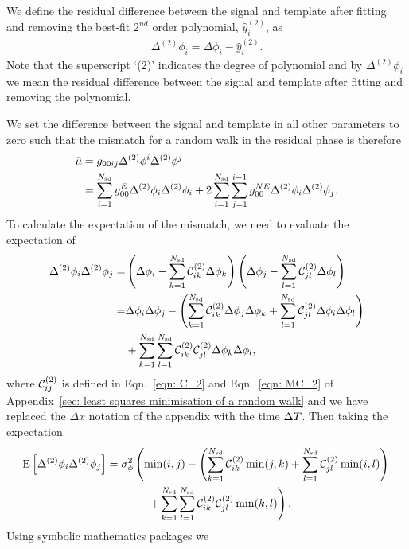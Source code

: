 \documentclass[../full_thesis/full_thesis.tex]{subfiles}
\begin{document}
We define the residual difference between the signal and template
after fitting and removing the best-fit $2^{nd}$ order polynomial, $\hat{y}_i^{(2)}$, as
\begin{align}
\Delta^{(2)}\phi_i = \Delta\phi_i - \hat{y}_i^{(2)}.
\label{eqn: D2phi}
\end{align}
Note that the superscript `(2)' indicates the degree of polynomial and by
$\Delta^{(2)}\phi_i$ we mean the residual difference between the signal and
template after fitting and removing the polynomial.

We set the difference between the signal and template in all other parameters
to zero such that the mismatch for a random walk in the residual phase is
therefore
\begin{align}
\tilde{\mu} & = g_{0 0 i j} \Delta^{(2)}\phi^{i}\Delta^{(2)}\phi^{j} \\
& = \sum_{i=1}^{N_{\textrm{sd}}}g_{00}^{E} \Delta^{(2)}\phi_{i}\Delta^{(2)}\phi_{i}
+ 2 \sum_{i=1}^{N_{\textrm{sd}}}\sum_{j=1}^{i-1}g_{00}^{NE}\Delta^{(2)}\phi_{i}\Delta^{(2)}\phi_{j}.
\label{eqn: 4202540871}
\end{align}
To calculate the expectation of the mismatch, we need to evaluate the
expectation of
\begin{align}
\Delta^{(2)}\phi_{i}\Delta^{(2)}\phi_{j} = & \left(\Delta\phi_{i}
- \sum_{k=1}^{N_{\textrm{sd}}}\mathcal{C}^{(2)}_{ik}\Delta\phi_{k}\right)
 \left(\Delta\phi_{j} - \sum_{l=1}^{N_{\textrm{sd}}}\mathcal{C}^{(2)}_{jl}\Delta\phi_{l}\right) \\
= & \Delta\phi_{i}\Delta\phi_{j} -
\left(\sum_{k=1}^{N_{\textrm{sd}}}\mathcal{C}^{(2)}_{ik} \Delta\phi_{j}\Delta\phi_{k}
+ \sum_{l=1}^{N_{\textrm{sd}}}\mathcal{C}^{(2)}_{jl}\Delta\phi_{i}\Delta\phi_{l}\right) \nonumber \\
& +
\sum_{k=1}^{N_{\textrm{sd}}}\sum_{l=1}^{N_{\textrm{sd}}}\mathcal{C}^{(2)}_{ik}\mathcal{C}^{(2)}_{jl} \Delta\phi_{k}\Delta\phi_{l},
\end{align}
where $\mathcal{C}^{(2)}_{ij}$ is defined in Eqn.~\eqref{eqn: C_2} and Eqn.~\eqref{eqn: MC_2} of
Appendix~\ref{sec: least squares minimisation of a random walk} and we have
replaced the $\Delta x$ notation of the appendix with the time $\Delta T$. Then
taking the expectation
\begin{align}
\E{\Delta^{(2)}\phi_{i}\Delta^{(2)}\phi_{j}} & =
\sigma^{2}_{\phi} \left(\min(i, j) - \left(\s{k=1}{\Nsd}\CT_{ik} \min(j, k)
+ \s{l=1}{\Nsd}\CT_{jl}\min(i, l) \right)\right. \notag \\
& \hspace{13mm} \left. + \s{k=1}{\Nsd}\s{l=1}{\Nsd}\CT_{ik}\CT_{jl}\min(k, l)\right).
\label{eqn: expected mismatch dP0idP0j_k2}
\end{align}
Using symbolic mathematics packages we
\end{document}
